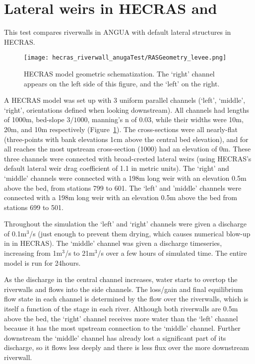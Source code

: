 \section{Lateral weirs in HECRAS and \anuga{}}

This test compares riverwalls in ANGUA with default lateral structures in
HECRAS. 

\begin{figure}
\begin{center}
\texttt{[image: hecras\_riverwall\_anugaTest/RASGeometry\_levee.png]}
\end{center}
\caption{HECRAS model geometric schematization. The `right' channel appears on
the left side of this figure, and the `left' on the right.}
\label{schematic}
\end{figure}

A HECRAS model was set up with 3 uniform parallel channels (`left', `middle',
`right', orientations defined when looking downstream). All channels had
lengths of 1000m, bed-slope $3/1000$, manning's n of 0.03, while their widths were 10m,
20m, and 10m respectively (Figure~\ref{schematic}). The cross-sections were all
nearly-flat (three-points with bank elevations 1cm above the central bed
elevation), and for all reaches the most upstream cross-section (1000) had an
elevation of 0m. These three channels were connected with broad-crested lateral
weirs (using HECRAS's default lateral weir drag coefficient of 1.1 in metric
units). The `right' and `middle' channels were connected with a 198m long weir
with an elevation 0.5m above the bed, from stations 799 to 601. The `left' and
'middle' channels were connected with a 198m long weir with an elevation 0.5m
above the bed from stations 699 to 501. 

Throughout the simulation the `left' and `right' channels were given a
discharge of 0.1m$^3$/s (just enough to prevent them drying, which causes numerical
blow-up in in HECRAS). The `middle' channel was given a discharge timeseries,
increasing from 1m$^3$/s to 21m$^3$/s over a few hours of simulated time. The entire model
is run for 24hours.

As the discharge in the central channel increases, water starts to overtop the
riverwalls and flows into the side channels. The loss/gain and final
equilibrium flow state in each channel is determined by the flow over the
riverwalls, which is itself a function of the stage in each river. Although
both riverwalls are 0.5m above the bed, the `right' channel receives more water
than the `left' channel because it has the most upstream connection to the
`middle' channel. Further downstream the `middle' channel has already lost a
significant part of its discharge, so it flows less deeply and there is less flux over
the more downstream riverwall.

